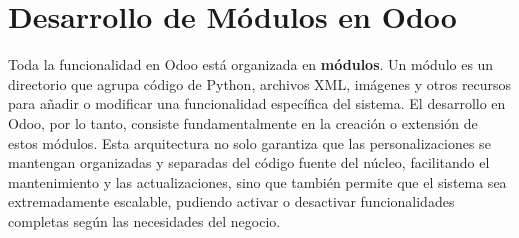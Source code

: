 \documentclass[12pt,letterpaper,spanish]{report}
\begin{document}
\section{Desarrollo de Módulos en Odoo}
\label{sec:desarrollo_modulos}

Toda la funcionalidad en Odoo está organizada en \textbf{módulos}. Un módulo es un directorio que agrupa código de Python, archivos XML, imágenes y otros recursos para añadir o modificar una funcionalidad específica del sistema. El desarrollo en Odoo, por lo tanto, consiste fundamentalmente en la creación o extensión de estos módulos. Esta arquitectura no solo garantiza que las personalizaciones se mantengan organizadas y separadas del código fuente del núcleo, facilitando el mantenimiento y las actualizaciones, sino que también permite que el sistema sea extremadamente escalable, pudiendo activar o desactivar funcionalidades completas según las necesidades del negocio.
\end{document}
